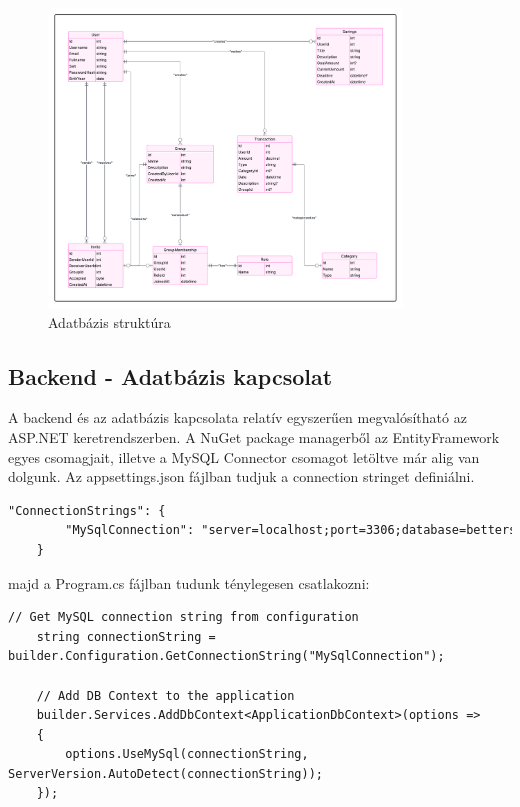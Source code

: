 \begin{figure}[H]
	\centering
	\includegraphics[height=300px]{img/db-model}
	\caption{Adatbázis struktúra}
	\label{fig:database-structure}
\end{figure}


\subsection{Backend - Adatbázis kapcsolat}
A backend és az adatbázis kapcsolata relatív egyszerűen megvalósítható az ASP.NET keretrendszerben.
A NuGet package managerből az EntityFramework egyes csomagjait,
illetve a MySQL Connector csomagot letöltve már alig van
dolgunk. Az appsettings.json fájlban tudjuk a connection
stringet definiálni.

\begin{lstlisting}[language={HTML}]
	"ConnectionStrings": {
		"MySqlConnection": "server=localhost;port=3306;database=betterspend;user=root;password=<<password>>;"
	}
\end{lstlisting}

majd a Program.cs fájlban tudunk ténylegesen csatlakozni:

\begin{lstlisting}[language={[Sharp]C}]
	// Get MySQL connection string from configuration
	string connectionString = builder.Configuration.GetConnectionString("MySqlConnection");
	
	// Add DB Context to the application
	builder.Services.AddDbContext<ApplicationDbContext>(options =>
	{
		options.UseMySql(connectionString, ServerVersion.AutoDetect(connectionString));
	});
\end{lstlisting}

